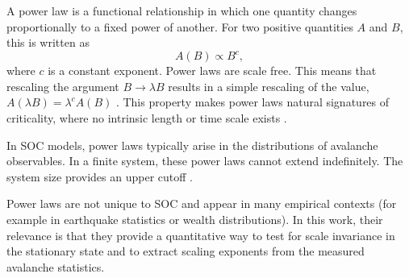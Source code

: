 A power law is a functional relationship in which one quantity changes proportionally to a fixed power of another. For two positive quantities $A$ and $B$, this is written as
\begin{equation}
    A(B) \propto B^{c},
\end{equation}
where $c$ is a constant exponent. Power laws are scale free. This means that rescaling the argument $B \to \lambda B$ results in a simple rescaling of the value, $A(\lambda B)=\lambda^{c}A(B)$ \cite{Newman2005}. This property makes power laws natural signatures of criticality, where no intrinsic length or time scale exists \cite{bak1987self}.

In SOC models, power laws typically arise in the distributions of avalanche observables. In a finite system, these power laws cannot extend indefinitely. The system size provides an upper cutoff \cite{christensen1991dynamical}.

Power laws are not unique to SOC and appear in many empirical contexts (for example in earthquake statistics or wealth distributions). In this work, their relevance is that they provide a quantitative way to test for scale invariance in the stationary state and to extract scaling exponents from the measured avalanche statistics.
